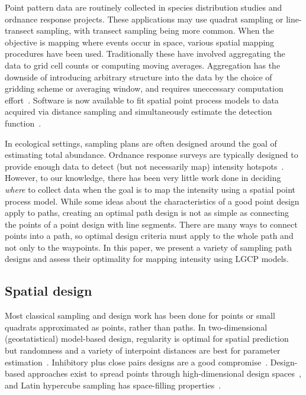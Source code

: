 \documentclass[review]{elsarticle}
\begin{document}
Point pattern data are routinely collected in species distribution studies and
ordnance response projects. These applications may use quadrat sampling or
line-transect sampling, with transect sampling being more common. When the
objective is mapping where events occur in space, various spatial mapping
procedures have been used. Traditionally these have involved aggregating the
data to grid cell counts or computing moving averages. Aggregation has the
downside of introducing arbitrary structure into the data by the choice of
gridding scheme or averaging window, and requires uneccessary computation
effort~\citep{simpsonetal}. Software is now available to fit spatial point
process models to data acquired via distance sampling and simultaneously
estimate the detection function~\citep{dspat,baser}.

In ecological settings, sampling plans are often designed around the goal of
estimating total abundance. Ordnance response surveys are typically designed
to provide enough data to detect (but not necessarily map) intensity
hotspots~\citep{em200-1-15,flaggetal}. However, to our knowledge, there has
been very little work done in deciding \emph{where} to collect data when the
goal is to map the intensity using a spatial point process model. While some
ideas about the characteristics of a good point design apply to paths, creating
an optimal path design is not as simple as connecting the points of a point
design with line segments. There are many ways to connect points into a path,
so optimal design criteria must apply to the whole path and not only to the
waypoints. In this paper, we present a variety of sampling path designs and
assess their optimality for mapping intensity using LGCP models.


\subsection{Spatial design}

Most classical sampling and design work has been done for points or small
quadrats approximated as points, rather than paths. In two-dimensional
(geostatistical) model-based design, regularity is optimal for spatial
prediction but randomness and a variety of interpoint distances are best for
parameter estimation~\citep{diggle}. Inhibitory plus close pairs designs are a
good compromise~\citep{chipetaetal2017}. Design-based approaches exist to
spread points through high-dimensional design spaces~\citep{borkowskipiepel},
and Latin hypercube sampling has space-filling
properties~\citep{mckayetal,husslageetal}.
\end{document}
